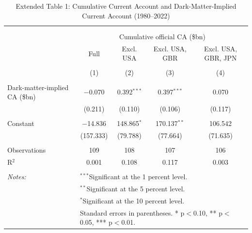 \documentclass[11pt]{article}
\begin{document}
\small
\setcounter{table}{0}

\renewcommand{\thetable}{E1}
\begin{table}[!htbp] \centering 
  \caption{Extended Table 1: Cumulative Current Account and Dark-Matter-Implied Current Account (1980--2022)} 
  \label{tab:E1_extended_CA_vs_DM} 
\begin{tabular}{@{\extracolsep{5pt}}lcccc} 
\\[-1.8ex]\hline 
\hline \\[-1.8ex] 
\\[-1.8ex] & \multicolumn{4}{c}{Cumulative official CA (\$bn)} \\ 
 & Full & Excl. USA & Excl. USA, GBR & Excl. USA, GBR, JPN \\ 
\\[-1.8ex] & (1) & (2) & (3) & (4)\\ 
\hline \\[-1.8ex] 
 Dark-matter-implied CA (\$bn) & $-$0.070 & 0.392$^{***}$ & 0.397$^{***}$ & 0.070 \\ 
  & (0.211) & (0.110) & (0.106) & (0.117) \\ 
  & & & & \\ 
 Constant & $-$14.836 & 148.865$^{*}$ & 170.137$^{**}$ & 106.542 \\ 
  & (157.333) & (79.788) & (77.664) & (71.635) \\ 
  & & & & \\ 
Observations & 109 & 108 & 107 & 106 \\ 
R$^{2}$ & 0.001 & 0.108 & 0.117 & 0.003 \\ 
\hline \\[-1.8ex] 
\textit{Notes:} & \multicolumn{4}{l}{$^{***}$Significant at the 1 percent level.} \\ 
 & \multicolumn{4}{l}{$^{**}$Significant at the 5 percent level.} \\ 
 & \multicolumn{4}{l}{$^{*}$Significant at the 10 percent level.} \\ 
 & \multicolumn{4}{l}{Standard errors in parentheses. * p$<$0.10, ** p$<$0.05, *** p$<$0.01.} \\ 
\end{tabular} 
\end{table} 
\end{document}
